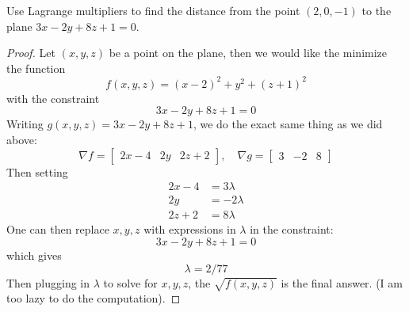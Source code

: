 \documentclass[openany]{book}
\begin{document}
\begin{prob}
Use Lagrange multipliers to find the distance from the point $(2, 0, -1)$ to the plane $3x - 2y + 8z + 1 = 0$.
\end{prob}
\begin{proof}
    Let $(x,y,z)$ be a point on the plane, then we would like the minimize the function 
    \begin{equation*}
        f(x,y,z)=(x-2)^2+y^2+(z+1)^2
    \end{equation*}
    with the constraint
    \begin{equation*}
        3x - 2y + 8z + 1 = 0
    \end{equation*}
    Writing $g(x,y,z)=3x - 2y + 8z + 1$, we do the exact same thing as we did above:
    \begin{equation*}
        \nabla f=\begin{bmatrix}
            2x-4&2y&2z+2
        \end{bmatrix}, \quad \nabla g=\begin{bmatrix}
            3&-2&8
        \end{bmatrix}
    \end{equation*}
    Then setting 
    \begin{align*}
        2x-4&=3\lambda\\
        2y&=-2\lambda\\
        2z+2&=8\lambda
    \end{align*}
    One can then replace $x,y,z$ with expressions in $\lambda$ in the constraint:
    \begin{equation*}
        3x-2y+8z+1=0
    \end{equation*}
    which gives 
    \begin{equation*}
        \lambda=2/77
    \end{equation*}
    Then plugging in $\lambda$ to solve for $x,y,z$, the $\sqrt{f(x,y,z)}$ is the final answer. (I am too lazy to do the computation).
\end{proof}
\end{document}
